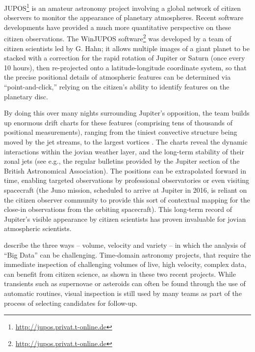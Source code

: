 \documentclass{ar2e}
\begin{document}
JUPOS\footnote{\url{http://jupos.privat.t-online.de}} is an amateur astronomy
project involving a global network of citizen observers to monitor the
appearance of planetary atmospheres.  Recent software developments have
provided a much more quantitative perspective on these citizen observations.
The WinJUPOS software\footnote{\url{http://jupos.privat.t-online.de}} was developed
by a team of citizen scientists led by G. Hahn; it allows multiple images of a
giant planet to be stacked with a correction for the rapid rotation of Jupiter
or Saturn  (once every 10 hours), then re-projected onto a latitude-longitude
coordinate system, so that the precise positional details of atmospheric
features can be determined via ``point-and-click,'' relying on the citizen's
ability to identify features on the planetary disc.  

By doing this over many nights surrounding Jupiter's opposition, the team
builds up enormous drift charts for these features (comprising tens of
thousands of positional measurements), ranging from the tiniest convective
structure being moved by the jet streams, to the largest vortices
\citep[e.g.][]{WinJUPOSRedSpot}.  The charts reveal the dynamic interactions
within the jovian weather layer, and the long-term stability of their zonal
jets (see e.g., the regular bulletins provided by the Jupiter section of the
British Astronomical Association). The positions can be extrapolated forward
in time, enabling targeted observations by professional observatories or even
visiting spacecraft (the Juno mission, scheduled to arrive at Jupiter in 2016,
is reliant on the citizen observer community to provide this sort of
contextual mapping for the close-in observations from the orbiting
spacecraft).  This long-term record of Jupiter's visible appearance by citizen
scientists has proven invaluable for jovian atmospheric scientists.


  \label{SNZoo} 
\citet{threeVs} describe the three ways -- volume, velocity and variety -- in
which the analysis of ``Big Data'' can be challenging. Time-domain astronomy
projects, that require the immediate inspection of challenging volumes of live,
high velocity, complex data, can benefit from citizen science, as shown in these
two recent projects.  While transients such as supernovae or asteroids can often
be found through the use of automatic routines, visual inspection is still used
by many teams as part of the process of selecting candidates for follow-up. 
\end{document}
